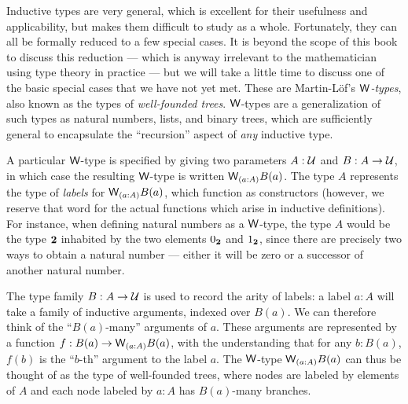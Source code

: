 Inductive types are very general, which is excellent for their usefulness and applicability, but makes them difficult to study as a whole.
Fortunately, they can all be formally reduced to a few special cases.
It is beyond the scope of this book to discuss this reduction --- which is anyway irrelevant to the mathematician using type theory in practice --- but we will take a little time to discuss one of the basic special cases that we have not yet met.
These are Martin-L{\"o}f's \emph{$\mathsf{W}$-types}, also known as the types of \emph{well-founded trees}.
%
$\mathsf{W}$-types are a generalization of such types as natural numbers, lists, and binary trees, which are sufficiently general to encapsulate the ``recursion'' aspect of \emph{any} inductive type.

A particular $\mathsf{W}$-type is specified by giving two parameters $A : \mathcal{U}$ and $B : A \to \mathcal{U}$, in which case the resulting $\mathsf{W}$-type is written $\wtype{a:A} B(a)$.
The type $A$ represents the type of \emph{labels} for $\wtype{a :A} B(a)$, which function as constructors (however, we reserve that word for the actual functions which arise in inductive definitions). For instance, when defining natural numbers as a $\mathsf{W}$-type,%
the type $A$ would be the type $\mathbf{2}$ inhabited by the two elements ${0_{\mathbf{2}}}$ and ${1_{\mathbf{2}}}$, since there are precisely two ways to obtain a natural number --- either it will be zero or a successor of another natural number.

The type family $B : A \to \mathcal{U}$ is used to record the arity of labels: a label $a : A$ will take a family of inductive arguments, indexed over $B(a)$. We can therefore think of the ``$B(a)$-many'' arguments of $a$. These arguments are represented by a function $f : B(a) \to \wtype{a :A} B(a)$, with the understanding that for any $b : B(a)$, $f(b)$ is the ``$b$-th'' argument to the label $a$. The $\mathsf{W}$-type $\wtype{a :A} B(a)$ can thus be thought of as the type of well-founded trees, where nodes are labeled by elements of $A$ and each node labeled by $a : A$ has $B(a)$-many branches.


